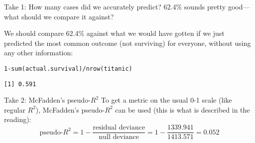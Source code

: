 \documentclass{beamer}\usepackage[]{graphicx}\usepackage[]{color}
\makeatletter
\newcommand{\hlnum}[1]{\textcolor[rgb]{0.824,0.412,0.118}{#1}}%
\newcommand{\hlopt}[1]{\textcolor[rgb]{1,0.894,0.769}{#1}}%
\newcommand{\hlstd}[1]{\textcolor[rgb]{1,0.894,0.769}{#1}}%
\newcommand{\hlkwb}[1]{\textcolor[rgb]{0.804,0.776,0.451}{#1}}%
\newcommand{\hlkwd}[1]{\textcolor[rgb]{1,0.78,0.769}{#1}}%
\newenvironment{kframe}{%
 \def\at@end@of@kframe{}%
 \ifinner\ifhmode%
  \def\at@end@of@kframe{\end{minipage}}%
  \begin{minipage}{\columnwidth}%
 \fi\fi%
 \def\FrameCommand##1{\hskip\@totalleftmargin \hskip-\fboxsep
 \colorbox{shadecolor}{##1}\hskip-\fboxsep
     \hskip-\linewidth \hskip-\@totalleftmargin \hskip\columnwidth}%
 \MakeFramed {\advance\hsize-\width
   \@totalleftmargin\z@ \linewidth\hsize
   \@setminipage}}%
 {\par\unskip\endMakeFramed%
 \at@end@of@kframe}
\newenvironment{knitrout}{}{} %
\makeatother
\begin{document}
\begin{darkframes}

    \begin{frame}[fragile]{Take 1: How many cases did we accurately predict?}
      62.4\% sounds pretty good---what should we compare it against?

      \bigskip
      \pause

      We should compare 62.4\% against what we would have gotten if we just predicted the most common outcome (not surviving) for everyone, without using any other information:
      \pause
      
\begin{knitrout}
\begin{kframe}
\begin{alltt}
\hlnum{1} \hlopt{-} \hlkwd{sum}\hlstd{(actual.survival)} \hlopt{/} \hlkwd{nrow}\hlstd{(titanic)}
\end{alltt}
\begin{verbatim}
[1] 0.591
\end{verbatim}
\end{kframe}
\end{knitrout}
    \end{frame}

    \begin{frame}{Take 2: McFadden's pseudo-$R^2$}
      To get a metric on the usual 0-1 scale (like regular $R^2$), McFadden's pseudo-$R^2$ can be used (this is what is described in the reading):
      \[
        \text{pseudo-}R^2 = 1 - \frac{\text{residual deviance}}{\text{null deviance}} = 1 - \frac{1339.941}{1413.571} = 0.052
      \]
    \end{frame}


\end{darkframes}
\end{document}
